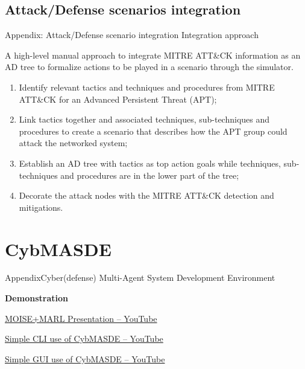 \subsection{Attack/Defense scenarios integration}
\begin{frame}{Appendix: Attack/Defense scenario integration}
    {Integration approach}

    A high-level manual approach to integrate MITRE ATT\&CK information as an AD tree to formalize actions to be played in a scenario through the simulator.

    \begin{enumerate}

        \item Identify relevant tactics and techniques and procedures from MITRE ATT\&CK for an Advanced Persistent Threat (APT);

        \item Link tactics together and associated techniques, sub-techniques and procedures to create a scenario that describes how the APT group could attack the networked system;

        \item Establish an AD tree with tactics as top action goals while techniques, sub-techniques and procedures are in the lower part of the tree;

        \item Decorate the attack nodes with the MITRE ATT\&CK detection and mitigations.

    \end{enumerate}

\end{frame}


\section{CybMASDE}

\begin{frame}{Appendix}{Cyber(defense) Multi-Agent System Development Environment}

    \vfill
    \begin{center}
        {\Huge \textbf{Demonstration}}
    \end{center}
    \vfill

    \href{https://www.youtube.com/watch?v=b3wqFpfXZi0}{MOISE+MARL Presentation -- YouTube}

    \href{https://www.youtube.com/watch?v=oKQ_a4C0Wxw}{Simple CLI use of CybMASDE -- YouTube}

    \href{https://www.youtube.com/watch?v=WKj8pFgOKEU}{Simple GUI use of CybMASDE -- YouTube}

\end{frame}


